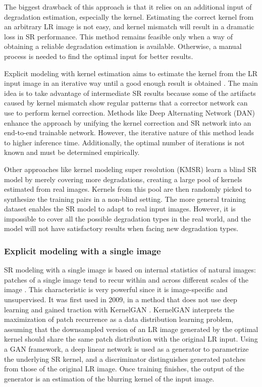         The biggest drawback of this approach is that it relies on an additional input of degradation estimation, especially the kernel. Estimating the correct kernel from an arbitrary LR image is not easy, and kernel mismatch will result in a dramatic loss in SR performance.
        This method remains feasible only when a way of obtaining a reliable degradation estimation is available.
        Otherwise, a manual process is needed to find the optimal input for better results.
        
        Explicit modeling with kernel estimation aims to estimate the kernel from the LR input image in an iterative way until a good enough result is obtained \cite{gu2019blind}.
        The main idea is to take advantage of intermediate SR results because some of the artifacts caused by kernel mismatch show regular patterns that a corrector network can use to perform kernel correction.
        Methods like Deep Alternating Network (DAN) \cite{luo2020unfolding} enhance the approach by unifying the kernel correction and SR network into an end-to-end trainable network. 
        However, the iterative nature of this method leads to higher inference time. Additionally, the optimal number of iterations is not known and must be determined empirically.

        Other approaches like kernel modeling super resolution (KMSR) \cite{zhou19}  learn a blind SR model by merely covering more degradations, creating a large pool of kernels estimated from real images.
        Kernels from this pool are then randomly picked to synthesize the training pairs in a non-blind setting. 
        The more general training dataset enables the SR model to adapt to real input images. 
        However, it is impossible to cover all the possible degradation types in the real world, and the model will not have satisfactory results when facing new degradation types.


        \subsubsection{Explicit modeling with a single image}

        SR modeling with a single image is based on internal statistics of natural images: patches of a single image tend to recur within and across different scales of the image \cite{zontak2011}.
        This characteristic is very powerful since it is image-specific and unsupervised. It was first used in 2009, in a method that does not use deep learning \cite{glasner2009} and gained traction with KernelGAN \cite{bellkligler2020blind}. 
        KernelGAN interprets the maximization of patch recurrence as a data distribution learning problem, assuming that the downsampled version of an LR image generated by the optimal kernel should share the same patch distribution with the original LR input.
        Using a GAN framework, a deep linear network is used as a generator to parametrize the underlying SR kernel, and a discriminator distinguishes generated patches from those of the original LR image.
        Once training finishes, the output of the generator is an estimation of the blurring kernel of the input image. 

